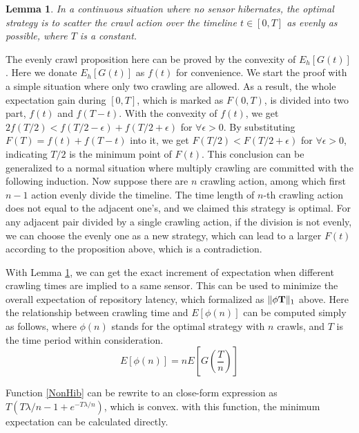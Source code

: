 \documentclass[conference]{IEEEtran}
\newtheorem{lemma}{Lemma}
\begin{document}
\begin{lemma}
\label{evenly}
In a continuous situation where no sensor hibernates, the optimal strategy is to scatter the crawl action over the timeline $t\in [0, T]$ as evenly as possible, where $T$ is a constant.
\end{lemma}
\begin{IEEEproof}
The evenly crawl proposition here can be proved by the convexity of $E_h[G(t)]$ \cite{boyd2004convex}. Here we donate $E_h[G(t)]$ as $f(t)$ for convenience. 
We start the proof with a simple situation where only two crawling are allowed. 
As a result, the whole expectation gain during $[0,T]$, which is marked as $F(0, T)$, is divided into two part, $f(t)$ and $f(T-t)$. With the convexity of $f(t)$, we get $2f(T/2)<f(T/2-\epsilon)+f(T/2+\epsilon)$ for $\forall{\epsilon>0}$. By substituting $F(T)=f(t)+f(T-t)$ into it, we get $F(T/2)<F(T/2+\epsilon)$ for $\forall{\epsilon>0}$, indicating $T/2$ is the minimum point of $F(t)$.
This conclusion can be generalized to a normal situation where multiply crawling are committed with the following induction. 
Now suppose there are $n$ crawling action, among which first $n-1$ action evenly divide the timeline. The time length of $n$-th crawling action does not equal to the adjacent one's, and we claimed this strategy is optimal. For any adjacent pair divided by a single crawling action, if the division is not evenly, we can choose the evenly one as a new strategy, which can lead to a larger $F(t)$ according to the proposition above, which is a contradiction.
\end{IEEEproof}


With Lemma \ref{evenly}, we can get the exact increment of expectation when different crawling times are implied to a same sensor. This can be used to minimize the overall expectation of repository latency, which formalized as $\Arrowvert \phi\mathbf{T} \Arrowvert_{1}$ above.
Here the relationship between crawling time and $E[\phi(n)]$ can be computed simply as follows, where $\phi(n)$ stands for the optimal strategy with $n$ crawls, and $T$ is the time period within consideration. 
\begin{equation}
E[\phi(n)]=nE[G(\frac{T}{n})]\label{NonHib}
\end{equation}

Function \eqref{NonHib} can be rewrite to an close-form expression as $T(T\lambda/n-1+e^{-T\lambda/n})$, which is convex. with this function, the minimum expectation can be calculated directly.
\end{document}
